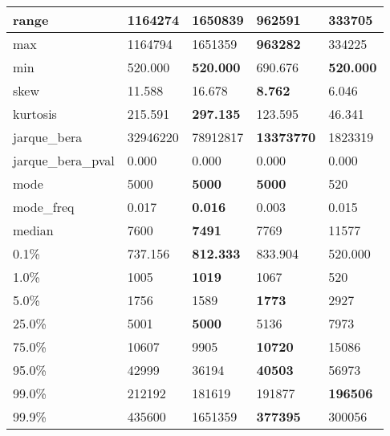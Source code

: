 \begin{table}[H]
\begin{tabular}{|l|m{10em}|m{10em}|m{10em}|m{10em}|}
\hline range & 1164274 & 1650839 & \bfseries 962591 & \cellcolor[rgb]{0.9, 0.54, 0.52} 333705 \\
\hline max & 1164794 & 1651359 & \bfseries 963282 & \cellcolor[rgb]{0.9, 0.54, 0.52} 334225 \\
\hline min & 520.000 & \bfseries 520.000 & \cellcolor[rgb]{0.9, 0.54, 0.52} 690.676 & \bfseries 520.000 \\
\hline skew & 11.588 & 16.678 & \bfseries 8.762 & \cellcolor[rgb]{0.9, 0.54, 0.52} 6.046 \\
\hline kurtosis & 215.591 & \bfseries 297.135 & 123.595 & \cellcolor[rgb]{0.9, 0.54, 0.52} 46.341 \\
\hline jarque\_bera & 32946220 & \cellcolor[rgb]{0.9, 0.54, 0.52} 78912817 & \bfseries 13373770 & 1823319 \\
\hline jarque\_bera\_pval & 0.000 & 0.000 & 0.000 & 0.000 \\
\hline mode & 5000 & \bfseries 5000 & \bfseries 5000 & \cellcolor[rgb]{0.9, 0.54, 0.52} 520 \\
\hline mode\_freq & 0.017 & \bfseries 0.016 & \cellcolor[rgb]{0.9, 0.54, 0.52} 0.003 & 0.015 \\
\hline median & 7600 & \bfseries 7491 & 7769 & \cellcolor[rgb]{0.9, 0.54, 0.52} 11577 \\
\hline 0.1\% & 737.156 & \bfseries 812.333 & 833.904 & \cellcolor[rgb]{0.9, 0.54, 0.52} 520.000 \\
\hline 1.0\% & 1005 & \bfseries 1019 & 1067 & \cellcolor[rgb]{0.9, 0.54, 0.52} 520 \\
\hline 5.0\% & 1756 & 1589 & \bfseries 1773 & \cellcolor[rgb]{0.9, 0.54, 0.52} 2927 \\
\hline 25.0\% & 5001 & \bfseries 5000 & 5136 & \cellcolor[rgb]{0.9, 0.54, 0.52} 7973 \\
\hline 75.0\% & 10607 & 9905 & \bfseries 10720 & \cellcolor[rgb]{0.9, 0.54, 0.52} 15086 \\
\hline 95.0\% & 42999 & 36194 & \bfseries 40503 & \cellcolor[rgb]{0.9, 0.54, 0.52} 56973 \\
\hline 99.0\% & 212192 & \cellcolor[rgb]{0.9, 0.54, 0.52} 181619 & 191877 & \bfseries 196506 \\
\hline 99.9\% & 435600 & \cellcolor[rgb]{0.9, 0.54, 0.52} 1651359 & \bfseries 377395 & 300056 \\
\hline
\end{tabular}
\end{table}
